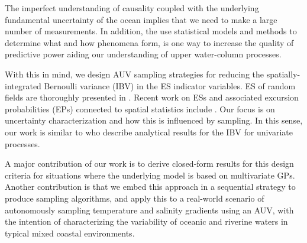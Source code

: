 \documentclass[aoas]{imsart}
\begin{document}


The imperfect understanding of causality coupled with the underlying
fundamental uncertainty of the ocean implies that we need to make a
large number of measurements. In addition, the use statistical models
and methods to determine what and how phenomena form, is one way to
increase the quality of predictive power aiding our understanding of
upper water-column processes. 

With this in mind, we design AUV sampling strategies for reducing the spatially-integrated Bernoulli variance (IBV) in the ES
indicator variables. 
ES of random fields are thoroughly presented in \citep{adler2009random}. Recent work on ESs and associated excursion
probabilities (EPs) connected to spatial statistics include
\cite{french2013spatio,bolin2015excursion,french2016credible}. Our
focus is on uncertainty characterization and how this is influenced by
sampling. In this sense, our work is similar to
\cite{bect2012,chevalier2014fast,azzimonti2016quantifying} who
describe analytical results for the IBV for univariate processes.

A major contribution of our work is to derive closed-form results for
this design criteria for situations where the underlying model is
based on multivariate GPs. Another contribution is that we embed this
approach in a sequential strategy to produce sampling algorithms, and
apply this to a real-world scenario of autonomously sampling
temperature and salinity gradients using an AUV, with the intention of
characterizing the variability of oceanic and riverine waters in
typical mixed coastal environments.
\end{document}
